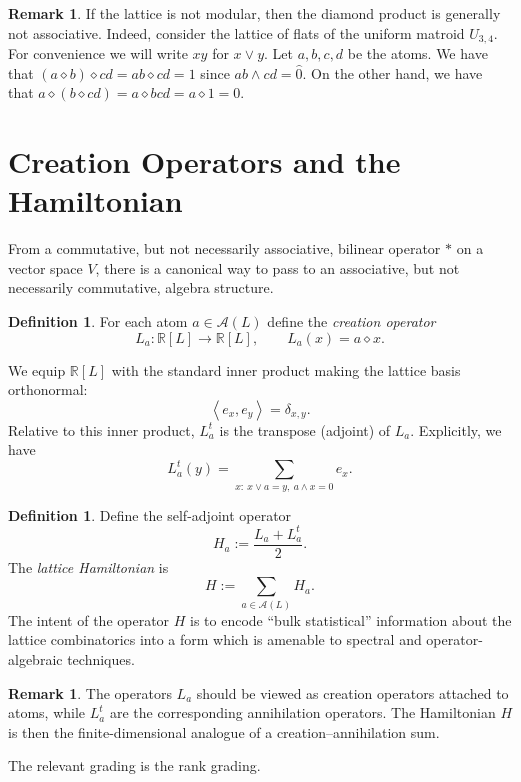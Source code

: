 \documentclass[11pt]{amsart}
\theoremstyle{definition}
\newtheorem{defn}[thm]{Definition}
\newtheorem{remark}[thm]{Remark}
\newcommand{\R}{\mathbb{R}}
\newcommand{\ip}[2]{\left\langle #1, #2 \right\rangle}
\newcommand{\At}{\mathcal{A}}
\newcommand{\de}{\delta}
\begin{document}
\begin{remark}
    If the lattice is not modular, then the diamond product is generally not associative. Indeed, consider the lattice of flats of the uniform matroid $U_{3,4}$. For convenience we will write $xy$ for $x\vee y$. Let $a,b,c,d$ be the atoms. We have that $(a\diamond b)\diamond cd = ab\diamond cd = 1$ since $ab\wedge cd = \hat 0$. On the other hand, we have that $a\diamond (b\diamond cd) = a\diamond bcd = a\diamond 1 = 0$.
\end{remark}

\section{Creation Operators and the Hamiltonian}

From a commutative, but not necessarily associative, bilinear operator $\ast$ on a vector space $V$, there is a canonical way to pass to an associative, but not necessarily commutative, algebra structure.

\begin{defn}
For each atom $a\in \At(L)$ define the \emph{creation operator}
\[
    L_a:\R[L]\to \R[L],\qquad L_a(x)=a\diamond x.
\]
\end{defn}

We equip $\R[L]$ with the standard inner product making the lattice basis orthonormal:
\[
\ip{e_x}{e_y}=\de_{x,y}.
\]
Relative to this inner product, $L_a^t$ is the transpose (adjoint) of $L_a$. Explicitly, we have
\[
    L_a^t(y) = \sum_{x:\ x\vee a=y,\ a\wedge x=0} e_x.
\]

\begin{defn}
Define the self-adjoint operator
\[
H_a:=\frac{L_a+L_a^t}{2}.
\]
The \emph{lattice Hamiltonian} is
\[
H:=\sum_{a\in \At(L)} H_a.
\]
The intent of the operator $H$ is to encode ``bulk statistical'' information about the lattice combinatorics into a form which is amenable to spectral and operator-algebraic techniques.
\end{defn}



\begin{remark}
The operators $L_a$ should be viewed as creation operators attached to atoms, while $L_a^t$ are the corresponding annihilation operators. The Hamiltonian $H$ is then the finite-dimensional analogue of a creation--annihilation sum.
\end{remark}

The relevant grading is the rank grading.
\end{document}
